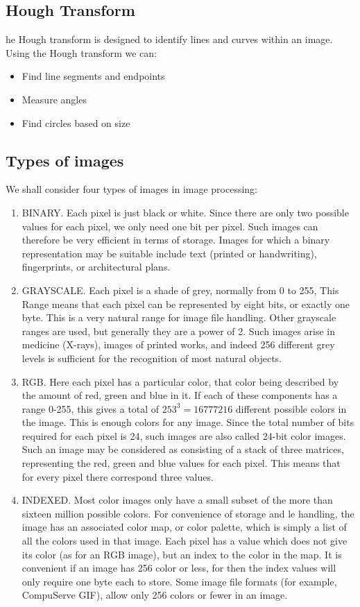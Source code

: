 \documentclass[a4paper,10pt]{article}
\begin{document}
\subsection{Hough Transform}
he Hough transform is designed to identify lines and curves within an image. Using the Hough transform we can:
\begin{itemize}
\item Find line segments and endpoints
\item Measure angles
\item Find circles based on size
\end{itemize}
\subsection{Types of images}
We shall consider four types of images in image processing:
\begin{enumerate}
\item BINARY. Each pixel is just black or white. Since there are only two possible values for each pixel, we only need one bit per pixel. Such images can therefore be very efficient in terms of storage. Images for which a binary representation may be suitable include text (printed or handwriting), fingerprints, or architectural plans.
\item GRAYSCALE. Each pixel is a shade of grey, normally from 0 to 255, This Range means that each pixel can be represented by eight bits, or exactly one byte. This is a very natural range for image file handling. Other grayscale ranges are used, but generally they are a power of 2. Such images arise in medicine (X-rays), images of printed works, and indeed 256 different grey levels is sufficient for the recognition of most natural objects.
\item RGB. Here each pixel has a particular color, that color being described by the amount of red, green and blue in it. If each of these components has a range 0-255, this gives a total of $253^3=16777216$ different possible colors in the image. This is enough colors for any image. Since the total number of bits required for each pixel is 24, such images are also called 24-bit color images. Such an image may be considered as consisting of a stack of three matrices, representing the red, green and blue values for each pixel. This means that for every pixel there correspond three values.
\item INDEXED. Most color images only have a small subset of the more than sixteen million possible colors. For convenience of storage and le handling, the image has an associated color map, or color palette, which is simply a list of all the colors used in that image. Each pixel has a value which does not give its color (as for an RGB image), but an index to the color in the map. It is convenient if an image has 256 color or less, for then the index values will only require one byte each to store. Some image file formats (for example, CompuServe GIF), allow only 256 colors or fewer in an image.
\end{enumerate}
\end{document}
